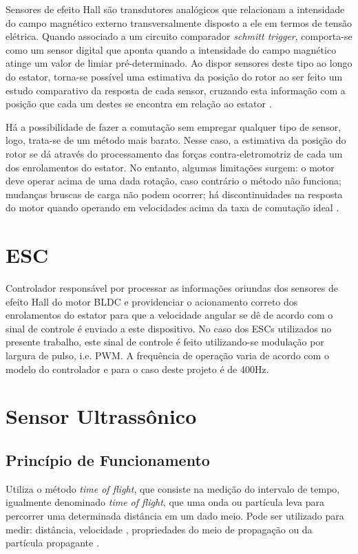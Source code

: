 Sensores de efeito Hall são transdutores analógicos que relacionam a intensidade do campo magnético externo transversalmente disposto a ele em termos 
de tensão elétrica. Quando associado a um circuito comparador \textit{schmitt trigger}, comporta-se como um sensor digital que aponta quando a 
intensidade do campo magnético atinge um valor de limiar pré-determinado. Ao dispor sensores deste tipo ao longo do estator, torna-se possível uma 
estimativa da posição do rotor ao ser feito um estudo comparativo da resposta de cada sensor, cruzando esta informação com a posição que 
cada um destes se encontra em relação ao estator \cite{motor_1}.

Há a possibilidade de fazer a comutação sem empregar qualquer tipo de sensor, logo, trata-se de um método mais barato. 
Nesse caso, a estimativa da posição do rotor se dá através do processamento das forças contra-eletromotriz de cada um dos enrolamentos do estator.
No entanto, algumas limitações surgem: o motor deve operar acima de uma dada rotação, caso contrário o método não funciona; mudanças bruscas de carga 
não podem ocorrer; há discontinuidades na resposta do motor quando operando em velocidades acima da taxa de comutação ideal \cite{motor_1}.

\section{ESC}
Controlador responsável por processar as informações oriundas dos sensores de efeito Hall do motor BLDC e providenciar o acionamento correto 
dos enrolamentos do estator para que a velocidade angular se dê de acordo com o sinal de controle é enviado a este dispositivo.
No caso dos ESCs utilizados no presente trabalho, este sinal de controle é feito utilizando-se modulação por largura de pulso, i.e. PWM. 
A frequência de operação varia de acordo com o modelo do controlador e para o caso deste projeto é de 400Hz.
\section{Sensor Ultrassônico}

\subsection{Princípio de Funcionamento}
Utiliza o método \textit{time of flight}, que consiste na medição do intervalo de tempo, igualmente denominado \textit{time of flight}, que uma onda 
ou partícula leva para percorrer uma determinada distância em um dado meio. 
Pode ser utilizado para medir: distância, velocidade \cite{TOF_velocity}, propriedades do meio de propagação ou da partícula propagante
\cite{TOF_medium1,TOF_medium2}.

